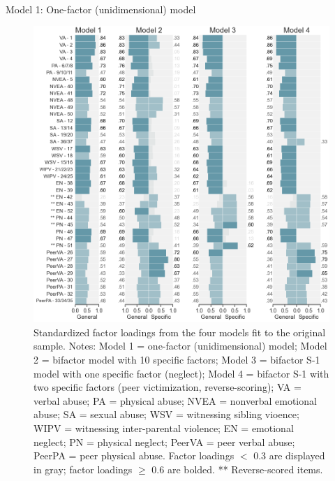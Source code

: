 \documentclass[letterpaper,man,natbib,noextraspace,floatsintext,longtable]{apa6}
\makeatletter
\renewcommand{\subsubsection}{\@startsection{subsubsection}{3}
  {\z@}%
  {\b@level@two@skip}{\e@level@two@skip}%
  {\normalfont\normalsize\bfseries}}
\makeatother
\begin{document}
{\begin{spacing}{0.2} \hfill \\ \end{spacing}} \subsubsection{Model 1: One-factor (unidimensional) model}

\begin{figure}[tp]
    \centering
    \includegraphics[width=1.1\textwidth,center]{figures/fig02.png}
    \captionsetup{width=1.1\textwidth}
    \caption{Standardized factor loadings from the four models fit to the original sample. Notes: Model 1 = one-factor (unidimensional) model; Model 2 = bifactor model with 10 specific factors; Model 3 = bifactor S-1 model with one specific factor (neglect); Model 4 = bifactor S-1 with two specific factors (peer victimization, reverse-scoring); VA = verbal abuse; PA = physical abuse; NVEA = nonverbal emotional abuse; SA = sexual abuse; WSV = witnessing sibling vioence; WIPV = witnessing inter-parental violence; EN = emotional neglect; PN = physical neglect; PeerVA = peer verbal abuse; PeerPA = peer physical abuse. Factor loadings $<$ 0.3 are displayed in gray; factor loadings $\geq$ 0.6 are bolded.  ** Reverse-scored items.}
    \label{fig:loadings_original}
\end{figure}
\end{document}
